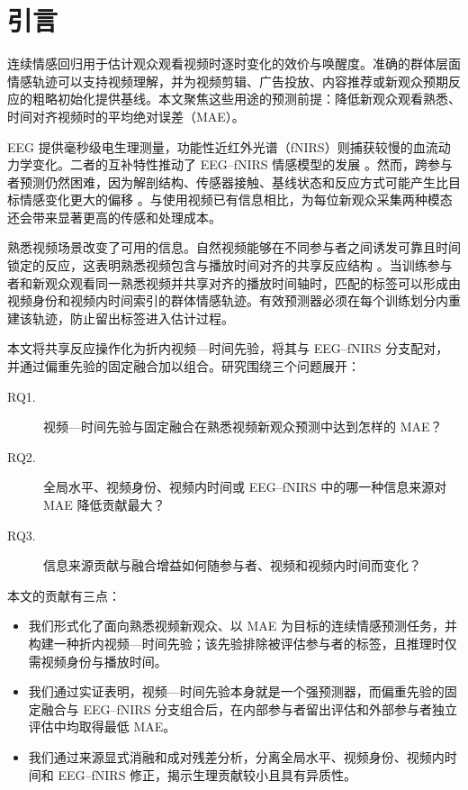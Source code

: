 \section{引言}
\label{sec:introduction}

连续情感回归用于估计观众观看视频时逐时变化的效价与唤醒度。准确的群体层面情感轨迹可以支持视频理解，并为视频剪辑、广告投放、内容推荐或新观众预期反应的粗略初始化提供基线。本文聚焦这些用途的预测前提：降低新观众观看熟悉、时间对齐视频时的平均绝对误差（MAE）。

EEG 提供毫秒级电生理测量，功能性近红外光谱（fNIRS）则捕获较慢的血流动力学变化。二者的互补特性推动了 EEG--fNIRS 情感模型的发展
\cite{bandara2018fnirs,sun2020multimodal,chen2024eegfnirs}。然而，跨参与者预测仍然困难，因为解剖结构、传感器接触、基线状态和反应方式可能产生比目标情感变化更大的偏移
\cite{li2022eegreview,li2018crosssubject}。与使用视频已有信息相比，为每位新观众采集两种模态还会带来显著更高的传感和处理成本。

熟悉视频场景改变了可用的信息。自然视频能够在不同参与者之间诱发可靠且时间锁定的反应，这表明熟悉视频包含与播放时间对齐的共享反应结构
\cite{hasson2004intersubject,kauppi2010isc,dmochowski2012correlated}。当训练参与者和新观众观看同一熟悉视频并共享对齐的播放时间轴时，匹配的标签可以形成由视频身份和视频内时间索引的群体情感轨迹。有效预测器必须在每个训练划分内重建该轨迹，防止留出标签进入估计过程。

本文将共享反应操作化为折内视频—时间先验，将其与 EEG--fNIRS 分支配对，并通过偏重先验的固定融合加以组合。研究围绕三个问题展开：

\begin{description}
  \item[RQ1.] 视频—时间先验与固定融合在熟悉视频新观众预测中达到怎样的 MAE？
  \item[RQ2.] 全局水平、视频身份、视频内时间或 EEG--fNIRS 中的哪一种信息来源对 MAE 降低贡献最大？
  \item[RQ3.] 信息来源贡献与融合增益如何随参与者、视频和视频内时间而变化？
\end{description}

本文的贡献有三点：

\begin{itemize}
  \item 我们形式化了面向熟悉视频新观众、以 MAE 为目标的连续情感预测任务，并构建一种折内视频—时间先验；该先验排除被评估参与者的标签，且推理时仅需视频身份与播放时间。
  \item 我们通过实证表明，视频—时间先验本身就是一个强预测器，而偏重先验的固定融合与 EEG--fNIRS 分支组合后，在内部参与者留出评估和外部参与者独立评估中均取得最低 MAE。
  \item 我们通过来源显式消融和成对残差分析，分离全局水平、视频身份、视频内时间和 EEG--fNIRS 修正，揭示生理贡献较小且具有异质性。
\end{itemize}

